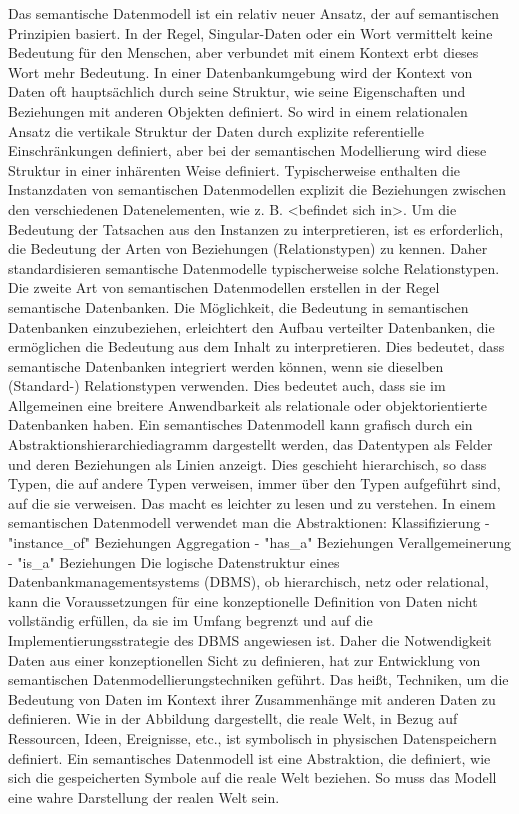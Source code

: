 Das semantische Datenmodell ist ein relativ neuer Ansatz, der auf semantischen Prinzipien basiert.  In der Regel, Singular-Daten oder ein Wort vermittelt keine Bedeutung für den Menschen, aber verbundet mit einem Kontext erbt dieses Wort mehr Bedeutung.
In einer Datenbankumgebung wird der Kontext von Daten oft hauptsächlich durch seine Struktur, wie seine Eigenschaften und Beziehungen mit anderen Objekten definiert. So wird in einem relationalen Ansatz die vertikale Struktur der Daten durch explizite referentielle Einschränkungen definiert, aber bei der semantischen Modellierung wird diese Struktur in einer inhärenten Weise definiert. \cite{hammer2008}
Typischerweise enthalten die Instanzdaten von semantischen Datenmodellen explizit die Beziehungen zwischen den verschiedenen Datenelementen, wie z. B. <befindet sich in>. Um die Bedeutung der Tatsachen aus den Instanzen zu interpretieren, ist es erforderlich, die Bedeutung der Arten von Beziehungen (Relationstypen) zu kennen. Daher standardisieren semantische Datenmodelle typischerweise solche Relationstypen. Die zweite Art von semantischen Datenmodellen erstellen in der Regel semantische Datenbanken. Die Möglichkeit, die Bedeutung in semantischen Datenbanken einzubeziehen, erleichtert den Aufbau verteilter Datenbanken, die ermöglichen die Bedeutung aus dem Inhalt zu interpretieren. Dies bedeutet, dass semantische Datenbanken integriert werden können, wenn sie dieselben (Standard-) Relationstypen verwenden. Dies bedeutet auch, dass sie im Allgemeinen eine breitere Anwendbarkeit als relationale oder objektorientierte Datenbanken haben. \cite{bekke2005}
Ein semantisches Datenmodell kann grafisch durch ein Abstraktionshierarchiediagramm dargestellt werden, das Datentypen als Felder und deren Beziehungen als Linien anzeigt. Dies geschieht hierarchisch, so dass Typen, die auf andere Typen verweisen, immer über den Typen aufgeführt sind, auf die sie verweisen. Das macht es leichter zu lesen und zu verstehen. \cite{hammer2008}
In einem semantischen Datenmodell verwendet man die Abstraktionen:
Klassifizierung - "{}instance\_of"{} Beziehungen
Aggregation - "{}has\_a"{} Beziehungen
Verallgemeinerung - "{}is\_a"{} Beziehungen
Die logische Datenstruktur eines Datenbankmanagementsystems (DBMS), ob hierarchisch, netz oder relational, kann die Voraussetzungen für eine konzeptionelle Definition von Daten nicht vollständig erfüllen, da sie im Umfang begrenzt und auf die Implementierungsstrategie des DBMS angewiesen ist. Daher die Notwendigkeit Daten aus einer konzeptionellen Sicht zu definieren, hat zur Entwicklung von semantischen Datenmodellierungstechniken geführt. Das heißt, Techniken, um die Bedeutung von Daten im Kontext ihrer Zusammenhänge mit anderen Daten zu definieren. Wie in der Abbildung dargestellt, die reale Welt, in Bezug auf Ressourcen, Ideen, Ereignisse, etc., ist symbolisch in physischen Datenspeichern definiert. Ein semantisches Datenmodell ist eine Abstraktion, die definiert, wie sich die gespeicherten Symbole auf die reale Welt beziehen. So muss das Modell eine wahre Darstellung der realen Welt sein. \cite{bekke2005}

